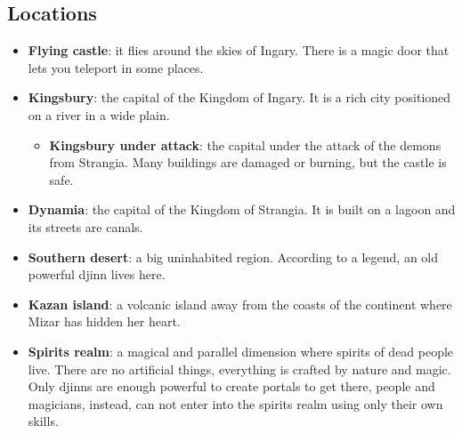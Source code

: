 \subsection{Locations}
\begin{itemize}
	\item \textbf{Flying castle}: it flies around the skies of Ingary. There is a magic door that lets you teleport in some places.
	
	\item \textbf{Kingsbury}: the capital of the Kingdom of Ingary. It is a rich city positioned on a river in a wide plain.
	
\begin{itemize}
	\item \textbf{Kingsbury under attack}: the capital under the attack of the demons from Strangia. Many buildings are damaged or burning, but the castle is safe.
\end{itemize}
	
	\item \textbf{Dynamia}: the capital of the Kingdom of Strangia. It is built on a lagoon and its streets are canals.
	
	\item \textbf{Southern desert}: a big uninhabited region. According to a legend, an old powerful djinn lives here.
	
	\item \textbf{Kazan island}: a volcanic island away from the coasts of the continent where Mizar has hidden her heart.
	
	\item \textbf{Spirits realm}: a magical and parallel dimension where spirits of dead people live. There are no artificial things, everything is crafted by nature and magic. Only djinns are enough powerful to create portals to get there, people and magicians, instead, can not enter into the spirits realm using only their own skills.

\end{itemize}
